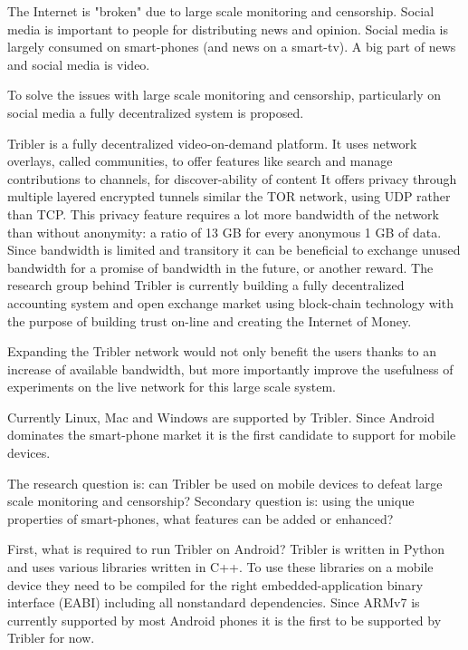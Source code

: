 The Internet is "broken" due to large scale monitoring and censorship.
Social media is important to people for distributing news and opinion.
Social media is largely consumed on smart-phones (and news on a smart-tv).
A big part of news and social media is video.

To solve the issues with large scale monitoring and censorship, particularly on social media a fully decentralized system is proposed.

Tribler is a fully decentralized video-on-demand platform.
It uses network overlays, called communities, to offer features like search and manage contributions to channels, for discover-ability of content
It offers privacy through multiple layered encrypted tunnels similar the TOR network, using UDP rather than TCP.
This privacy feature requires a lot more bandwidth of the network than without anonymity: a ratio of 13 GB for every anonymous 1 GB of data.
Since bandwidth is limited and transitory it can be beneficial to exchange unused bandwidth for a promise of bandwidth in the future, or another reward.
The research group behind Tribler is currently building a fully decentralized accounting system and open exchange market using block-chain technology with the purpose of building trust on-line and creating the Internet of Money.

Expanding the Tribler network would not only benefit the users thanks to an increase of available bandwidth, but more importantly improve the usefulness of experiments on the live network for this large scale system.

Currently Linux, Mac and Windows are supported by Tribler. 
Since Android dominates the smart-phone market it is the first candidate to support for mobile devices.

The research question is: can Tribler be used on mobile devices to defeat large scale monitoring and censorship?
Secondary question is: using the unique properties of smart-phones, what features can be added or enhanced?

First, what is required to run Tribler on Android?
Tribler is written in Python and uses various libraries written in C++.
To use these libraries on a mobile device they need to be compiled for the right embedded-application binary interface (EABI) including all nonstandard dependencies.
Since ARMv7 is currently supported by most Android phones it is the first to be supported by Tribler for now.


